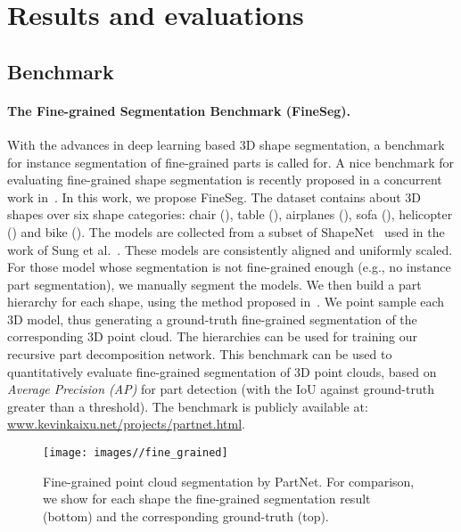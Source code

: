 

\section{Results and evaluations}


\subsection{Benchmark}

\paragraph{The Fine-grained Segmentation Benchmark (FineSeg).}
With the advances in deep learning based 3D shape segmentation, a benchmark for instance segmentation of fine-grained parts is called for. A nice benchmark for evaluating fine-grained shape segmentation is recently proposed in a concurrent work in~\cite{mo2018partnet}. In this work, we propose FineSeg. The dataset contains about  3D shapes over six shape categories: chair (), table (), airplanes (), sofa (), helicopter () and bike (). The models are collected from a subset of ShapeNet~\cite{Shapenet} used in the work of Sung et al.~\cite{sung2017}. These models are consistently aligned and uniformly scaled. For those model whose segmentation is not fine-grained enough (e.g., no instance part segmentation), we manually segment the models. We then build a part hierarchy for each shape, using the method proposed in~\cite{wang2011symmetry}.
We point sample each 3D model, thus generating a ground-truth fine-grained segmentation of the corresponding 3D point cloud. The hierarchies can be used for training our recursive part decomposition network. This benchmark can be used to quantitatively evaluate fine-grained segmentation of 3D point clouds, based on \emph{Average Precision (AP)} for part detection (with the IoU against ground-truth greater than a threshold).
The benchmark is publicly available at: \url{www.kevinkaixu.net/projects/partnet.html}.

\begin{figure*}[htbp]
  \centering
  \texttt{[image: images//fine\_grained]}
  \caption{Fine-grained point cloud segmentation by PartNet. For comparison, we show for each shape the fine-grained segmentation result (bottom) and the corresponding ground-truth (top).}
  \label{fine_grained}
\end{figure*}






